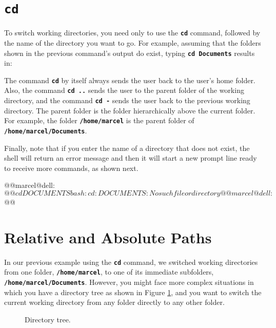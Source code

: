\section{\textbf{\texttt{cd}}}
\label{sub:cd}
To switch working directories, you need only to use the \textbf{\texttt{cd}} command, followed by the name of the directory you want to go. For example, assuming that the folders shown in the previous command's output do exist, typing \textbf{\texttt{cd Documents}} results in:

The command \textbf{\texttt{cd}} by itself always sends the user back to the user's home folder. Also, the command \textbf{\texttt{cd ..}} sends the user to the parent folder of the working directory, and the command \textbf{\texttt{cd -}} sends the user back to the previous working directory. The parent folder is the folder hierarchically above the current folder. For example, the folder \textbf{\texttt{/home/marcel}} is the parent folder of \textbf{\texttt{/home/marcel/Documents}}.

Finally, note that if you enter the name of a directory that does not exist, the shell will return an error message and then it will start a new prompt line ready to receive more commands, as shown next.

\begin{command_line}[make]
@@marcel@dell:~$@@ cd DOCUMENTS
bash: cd: DOCUMENTS: No such file or directory
@@marcel@dell:~$@@
\end{command_line}

\section{Relative and Absolute Paths}

In our previous example using the \textbf{\texttt{cd}} command, we switched working directories from one folder, \textbf{\texttt{/home/marcel}}, to one of its immediate subfolders, \textbf{\texttt{/home/marcel/Documents}}. However, you might face more complex situations in which you have a directory tree as shown in Figure \ref{fig:ch2_dirtree}, and you want to switch the current working directory from any folder directly to any other folder.

\begin{figure}[!htbp]
  \centering
        
        \caption{Directory tree.}
        \label{fig:ch2_dirtree}
\end{figure}

